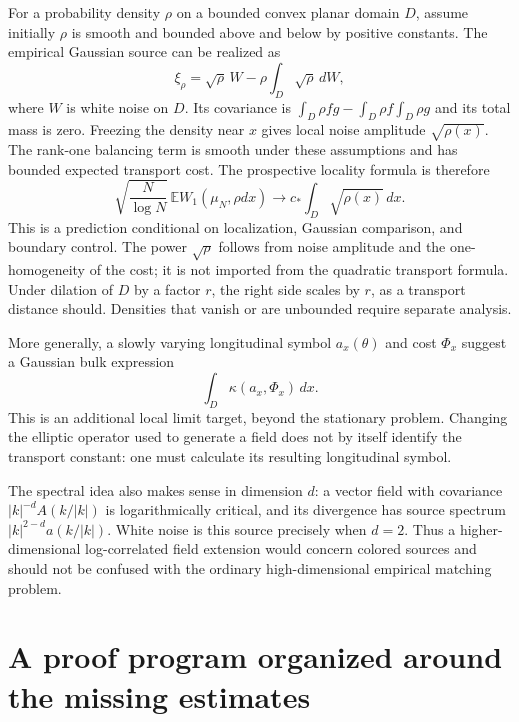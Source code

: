 \documentclass[11pt]{article}
\theoremstyle{definition}
\newcommand{\E}{\mathbb E}
\newcommand{\dd}{\,dx}
\begin{document}
For a probability density $\rho$ on a bounded convex planar domain $D$,
assume initially $\rho$ is smooth and bounded above and below by positive
constants. The empirical Gaussian source can be realized as
\begin{equation}\label{eq:densitybridge}
  \xi_\rho=\sqrt\rho\,W
       -\rho\int_D\sqrt\rho\,dW,
\end{equation}
where $W$ is white noise on $D$. Its covariance is
$\int_D\rho fg-\int_D\rho f\int_D\rho g$ and its total mass is zero.
Freezing the density near $x$ gives local noise amplitude
$\sqrt{\rho(x)}$. The rank-one balancing term is smooth under these
assumptions and has bounded expected transport cost. The prospective
locality formula is therefore
\begin{equation}\label{eq:densityprediction}
  \sqrt{\frac N{\log N}}\,\E W_1(\mu_N,\rho dx)
  \longrightarrow c_*\int_D\sqrt{\rho(x)}\dd.
\end{equation}
This is a prediction conditional on localization, Gaussian comparison,
and boundary control. The power $\sqrt\rho$ follows from noise amplitude
and the one-homogeneity of the cost; it is not imported from the
quadratic transport formula. Under dilation of $D$ by a factor $r$,
the right side scales by $r$, as a transport distance should. Densities
that vanish or are unbounded require separate analysis.

More generally, a slowly varying longitudinal symbol $a_x(\theta)$ and
cost $\Phi_x$ suggest a Gaussian bulk expression
\[
  \int_D\kappa(a_x,\Phi_x)\dd.
\]
This is an additional local limit target, beyond the stationary
problem. Changing the elliptic operator used to generate a field does
not by itself identify the transport constant: one must calculate its
resulting longitudinal symbol.

The spectral idea also makes sense in dimension $d$: a vector field with
covariance $|k|^{-d}A(k/|k|)$ is logarithmically critical, and its
divergence has source spectrum $|k|^{2-d}a(k/|k|)$. White noise is this
source precisely when $d=2$. Thus a higher-dimensional log-correlated
field extension would concern colored sources and should not be
confused with the ordinary high-dimensional empirical matching problem.

\section{A proof program organized around the missing estimates}
\label{sec:program}
\end{document}
